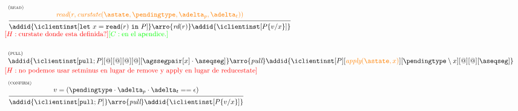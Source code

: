 \documentclass[envcountsect,runningheads,orivec]{llncs}
\begin{document}
\[\begin{array}{l}
\\[15pt]
	\mathrule{read}
		{\iread{r}{\curstate{\known}{\pending}{\pushbuffer}{\transactionbuffer}}}
		{\addid{\iclientinst[\treadins{x}{r}]} \arro{\readtran{r}} \addid{\iclientinst[{P}\subst{x}{v}]}}
\\
\henote{\mbox{curstate donde esta definida?}}
\chnote{\mbox{en el apendice.}}

\\[15pt]


	\mathaxiom{pull}
		{
			\addid{\iclientinst[\tpullins][@][@][@][@][{\agssegpair[x]}\cdot\receivebuffer]}
			\arro{\pulltran} 
			\addid{\iclientinst[P]
						 [\iapply{\known}{x}]
						 [{\pending}\setminus x]
						 [@][@]
						 [{\receivebuffer}]
				}
		}
		\\
\henote{\mbox{no podemos usar setminus en lugar de remove y apply en lugar de reducestate}}
\\[5pt]
		\mathrule{confirm}
		{ v = (\pending \cdot \pushbuffer \cdot\transactionbuffer == \epsilon) }
		{
			\addid{\iclientinst[\tpullins]}
			\arro{\pulltran} 
			\addid{\iclientinst[P\subst{x}{v}]		
				}
		}
	

\end{array}\]
\end{document}
